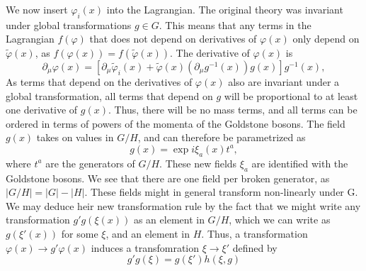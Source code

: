We now insert $\varphi_i(x)$ into the Lagrangian.
The original theory was invariant under global transformations $g \in G$.
This means that any terms in the Lagrangian $f(\varphi)$ that does not depend on derivatives of $\varphi(x)$ only depend on $\tilde \varphi(x)$, as $f(\varphi(x)) = f(\tilde \varphi(x))$.
The derivative of $\varphi(x)$ is
\begin{equation}
    \partial_\mu \varphi(x) = [\partial_\mu \tilde \varphi_i(x) + \tilde \varphi(x) (\partial_\mu g^{-1}(x)) g(x) ]g^{-1}(x),
\end{equation}
As terms that depend on the derivatives of $\varphi(x)$ also are invariant under a global transformation, all terms that depend on $g$ will be proportional to at least one derivative of $g(x)$.
Thus, there will be no mass terms, and all terms can be ordered in terms of powers of the momenta of the Goldstone bosons.
The field $g(x)$ takes on values in $G / H$, and can therefore be parametrized as 
\begin{equation}
    g(x) = \exp{i \xi_a(x) t^a},
\end{equation}
where $t^a$ are the generators of $G / H$. 
These new fields $\xi_a$ are identified with the Goldstone bosons.
We see that there are one field per broken generator, as $|G/H| = |G| - |H|$.
These fields might in general transform non-linearly under G.
We may deduce heir new transformation rule by the fact that we might write any transformation $g' g(\xi(x))$ as an element in $G/H$, which we can write as $g(\xi'(x))$ for some $\xi$, and an element in $H$.
Thus, a transformation $\varphi(x) \rightarrow g' \varphi(x)$ induces a transfomration $\xi \rightarrow \xi'$ defined by 
\begin{equation}
    g' g(\xi) = g(\xi') h(\xi, g)
\end{equation}


